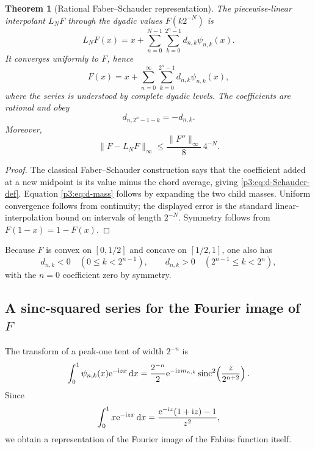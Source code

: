 \documentclass[11pt]{article}
\newtheorem{theorem}{Theorem}[section]
\theoremstyle{definition}
\theoremstyle{remark}
\newcommand{\dd}{\,\mathrm d}
\begin{document}
\begin{theorem}[Rational Faber--Schauder representation]
\label{p3:thm:Faber-Schauder-F}
The piecewise-linear interpolant $L_NF$ through the dyadic values
$F(k2^{-N})$ is
\begin{equation}\label{p3:eq:LN-F-Schauder}
 L_NF(x)=x+\sum_{n=0}^{N-1}\sum_{k=0}^{2^n-1}
 d_{n,k}\psi_{n,k}(x).
\end{equation}
It converges uniformly to $F$, hence
\begin{equation}\label{p3:eq:F-Schauder-series}
 F(x)=x+\sum_{n=0}^\infty\sum_{k=0}^{2^n-1}
 d_{n,k}\psi_{n,k}(x),
\end{equation}
where the series is understood by complete dyadic levels.  The coefficients are
rational and obey
\begin{equation}\label{p3:eq:d-antisymmetry}
 d_{n,2^n-1-k}=-d_{n,k}.
\end{equation}
Moreover,
\begin{equation}\label{p3:eq:F-interpolation-error}
 \|F-L_NF\|_\infty
 \le\frac{\|F''\|_\infty}{8}\,4^{-N}.
\end{equation}
\end{theorem}

\begin{proof}
The classical Faber--Schauder construction says that the coefficient added at a
new midpoint is its value minus the chord average, giving
\eqref{p3:eq:d-Schauder-def}.  Equation \eqref{p3:eq:d-mass} follows by expanding the
two child masses.  Uniform convergence follows from continuity; the displayed
error is the standard linear-interpolation bound on intervals of length
$2^{-N}$.  Symmetry follows from $F(1-x)=1-F(x)$.
\end{proof}

Because $F$ is convex on $[0,1/2]$ and concave on $[1/2,1]$, one also has
\begin{equation}\label{p3:eq:d-sign}
 d_{n,k}<0\quad(0\le k<2^{n-1}),
 \qquad
 d_{n,k}>0\quad(2^{n-1}\le k<2^n),
\end{equation}
with the $n=0$ coefficient zero by symmetry.

\subsection{A sinc-squared series for the Fourier image of $F$}

The transform of a peak-one tent of width $2^{-n}$ is
\begin{equation}\label{p3:eq:tent-transform}
 \int_0^1\psi_{n,k}(x)\e^{-\ii zx}\dd x
 =\frac{2^{-n}}{2}\e^{-\ii z m_{n,k}}
 \sinc^2\!\left(\frac{z}{2^{n+2}}\right).
\end{equation}
Since
\begin{equation}\label{p3:eq:x-transform}
 \int_0^1x\e^{-\ii zx}\dd x
 =\frac{\e^{-\ii z}(1+\ii z)-1}{z^2},
\end{equation}
we obtain a representation of the Fourier image of the Fabius function itself.
\end{document}
